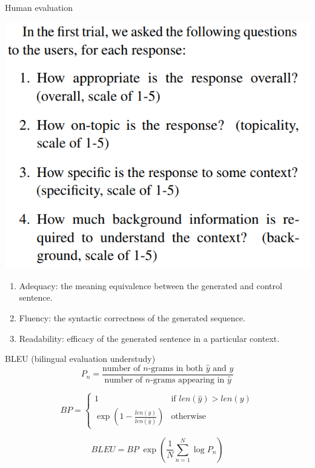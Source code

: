 \documentclass[10pt]{beamer}
\begin{document}
\begin{frame}{Human evaluation  \cite{Lowe:2016}}
\begin{center}
\includegraphics[scale=0.2]{images/exemploEval1.png}
\end{center}

\begin{enumerate}
\item \alert{Adequacy}: the meaning equivalence between the generated and control sentence. 
\item \alert{Fluency}: the syntactic correctness of the generated sequence.
\item \alert{Readability}: efficacy of the generated sentence in a particular context.
\end{enumerate}

\end{frame}

\begin{frame}{BLEU (bilingual evaluation understudy)}
\begin{equation}
P_n = \frac{\text{number of } n\text{-grams in both } \hat{y} \text{ and } y}{\text{number of } n\text{-grams appearing in } \hat{y}}
\end{equation}    
\vspace{0.2cm}

\begin{equation}
BP=
\begin{cases}
1 & \text{if } len(\hat{y}) > len(y) \\
\exp\left( 1 - \frac{len(y)}{len(\hat{y})} \right) & \text{otherwise}
\end{cases}
\end{equation} 
\vspace{0.2cm}

\begin{equation}
BLEU = BP \; \exp \left(\frac{1}{N}  \sum_{n=1}^{N} \log P_n \right)
\end{equation}
\end{frame}
\end{document}

